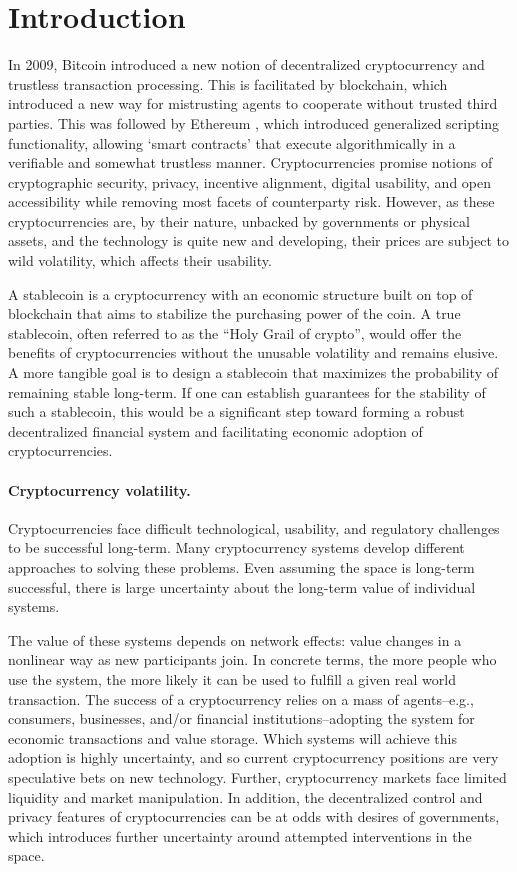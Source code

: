 \section{Introduction}\label{sec:introduction}

In 2009, Bitcoin \cite{bitcoin2009} introduced a new notion of decentralized cryptocurrency and trustless transaction processing. This is facilitated by blockchain, which introduced a new way for mistrusting agents to cooperate without trusted third parties. This was followed by Ethereum \cite{ethereum2014}, which introduced generalized scripting functionality, allowing `smart contracts' that execute algorithmically in a verifiable and somewhat trustless manner. Cryptocurrencies promise notions of cryptographic security, privacy, incentive alignment, digital usability, and open accessibility while removing most facets of counterparty risk. However, as these cryptocurrencies are, by their nature, unbacked by governments or physical assets, and the technology is quite new and developing, their prices are subject to wild volatility, which affects their usability.


A stablecoin is a cryptocurrency with an economic structure built on top of blockchain that aims to stabilize the purchasing power of the coin. A true stablecoin, often referred to as the ``Holy Grail of crypto'', would offer the benefits of cryptocurrencies without the unusable volatility and remains elusive. A more tangible goal is to design a stablecoin that maximizes the probability of remaining stable long-term. If one can establish guarantees for the stability of such a stablecoin, this would be a significant step toward forming a robust decentralized financial system and facilitating economic adoption of cryptocurrencies.



\paragraph{Cryptocurrency volatility.}
Cryptocurrencies face difficult technological, usability, and regulatory challenges to be successful long-term. Many cryptocurrency systems develop different approaches to solving these problems. Even assuming the space is long-term successful, there is large uncertainty about the long-term value of individual systems.

The value of these systems depends on network effects: value changes in a nonlinear way as new participants join. In concrete terms, the more people who use the system, the more likely it can be used to fulfill a given real world transaction. The success of a cryptocurrency relies on a mass of agents--e.g., consumers, businesses, and/or financial institutions--adopting the system for economic transactions and value storage. Which systems will achieve this adoption is highly uncertainty, and so current cryptocurrency positions are very speculative bets on new technology. Further, cryptocurrency markets face limited liquidity and market manipulation. In addition, the decentralized control and privacy features of cryptocurrencies can be at odds with desires of governments, which introduces further uncertainty around attempted interventions in the space.

